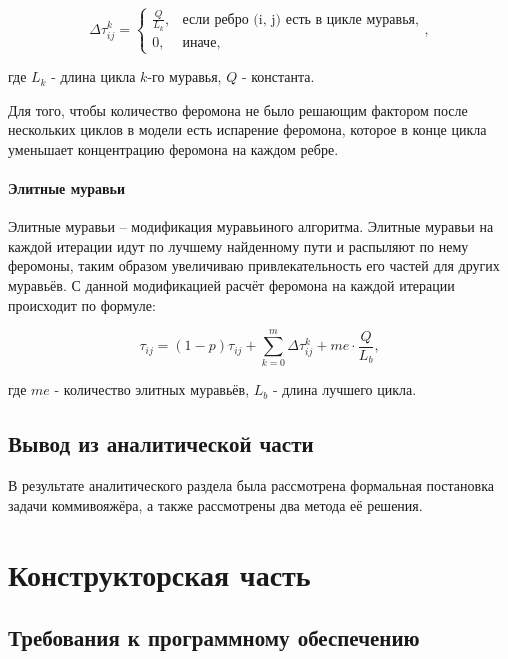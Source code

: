 \begin{equation}
    \Delta\tau^k_{ij} = \begin{cases} \frac{Q}{L_k}, &\text{если ребро (i, j) есть в цикле муравья}, \\ 0, &\text{иначе}, \end{cases},
\end{equation}

где $L_k$ - длина цикла $k$-го муравья, $Q$ - константа.

Для того, чтобы количество феромона не было решающим фактором после нескольких циклов в модели есть испарение феромона, которое в конце цикла уменьшает концентрацию феромона на каждом ребре.

\subsubsection{Элитные муравьи}

Элитные муравьи -- модификация муравьиного алгоритма. Элитные муравьи на каждой итерации идут по лучшему найденному пути и распыляют по нему феромоны, таким образом увеличиваю привлекательность его частей для других муравьёв. С данной модификацией расчёт феромона на каждой итерации происходит по формуле:

\begin{equation}
    \tau_{ij} = (1-p)\tau_{ij} + \sum_{k=0}^{m}\Delta\tau^k_{ij} + me \cdot \frac{Q}{L_b},
\end{equation}

где $me$ - количество элитных муравьёв, $L_b$ - длина лучшего цикла.

\section{Вывод из аналитической части}

В результате аналитического раздела была рассмотрена формальная постановка задачи коммивояжёра, а также рассмотрены два метода её решения.

\clearpage

\chapter{Конструкторская часть}

\section{Требования к программному обеспечению}

